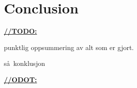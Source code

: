 \chapter{Conclusion}

\underline{\textbf{\LARGE //TODO:}}

punktlig oppsummering av alt som er gjort.

s\aa~konklusjon

\underline{\textbf{\LARGE //ODOT:}}